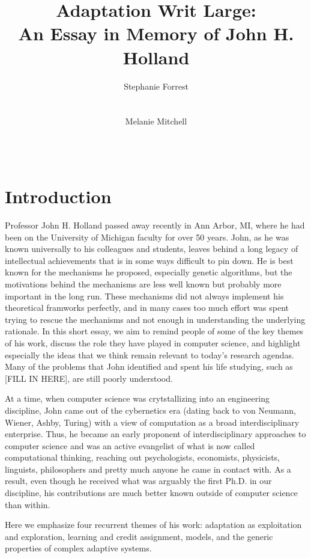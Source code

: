 \documentclass{sig-alternate}
\title{Adaptation Writ Large:\\ An Essay in Memory of John H. Holland}
\author 
{\alignauthor
 Stephanie Forrest\\
 \affaddr{University of New Mexico}\\
 \affaddr{Santa Fe Institute}\\
 \email{forrest@cs.unm.edu}
 \alignauthor
Melanie Mitchell \\
 \affaddr{Portland State University}\\
 \affaddr{Santa Fe Institute}\\
 \email{mm@pdx.edu}
}
\begin{document}
\maketitle

% 

\section{Introduction}

Professor John H. Holland passed away recently in Ann Arbor, MI, where
he had been on the University of Michigan faculty for over 50 years.
John, as he was known universally to his colleagues and students,
leaves behind a long legacy of intellectual achievements that is in
some ways difficult to pin down.  He is best known for the mechanisms
he proposed, especially genetic algorithms, but the motivations behind
the mechanisms are less well known but probably more important in the
long run.  These mechanisms did not always implement his theoretical
framworks perfectly, and in many cases too much effort was spent
trying to rescue the mechanisms and not enough in understanding the
underlying rationale.  In this short essay, we aim to remind people of
some of the key themes of his work, discuss the role they have played
in computer science, and highlight especially the ideas that we think
remain relevant to today's research agendas.  Many of the problems
that John identified and spent his life studying, such as [FILL IN
  HERE], are still poorly understood.

At a time, when computer science was crytstallizing into an
engineering discipline, John came out of the cybernetics era (dating
back to von Neumann, Wiener, Ashby, Turing) with a view of computation
as a broad interdisciplinary enterprise.  Thus, he became an early
proponent of interdisciplinary approaches to computer science and was
an active evangelist of what is now called computational thinking,
reaching out psychologists, economists, physicists, linguists,
philosophers and pretty much anyone he came in contact with.  As a
result, even though he received what was arguably the first Ph.D. in
our discipline, his contributions are much better known outside of
computer science than within.

Here we emphasize four recurrent themes of his work: adaptation as
exploitation and exploration, learning and credit assignment, models,
and the generic properties of complex adaptive systems.
\end{document}
